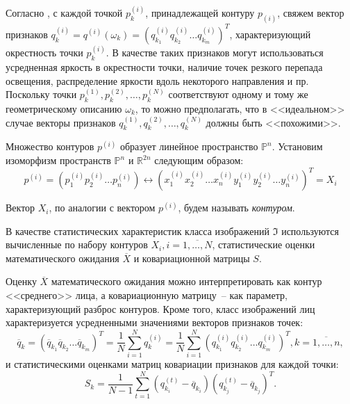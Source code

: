 Согласно \cite{harak_points}, с каждой точкой $p^{(i)}_k$, принадлежащей контуру $p_{(i)}$, свяжем
вектор признаков $q^{(i)}_k = q^{(i)}(\omega_k) = (q^{(i)}_{k_1}  q^{(i)}_{k_2}  \dots  q^{(i)}_{k_m})^T$,
характеризующий окрестность точки $p^{(i)}_k$. В качестве таких признаков могут 
использоваться усредненная яркость в окрестности точки, наличие точек резкого перепада освещения, распределение яркости 
вдоль некоторого направления и пр. Поскольку точки
$ p^{(1)}_k, p^{(2)}_k, \dots, p^{(N)}_k $ соответствуют одному и тому же геометрическому описанию $ \omega_k $,
то можно предполагать, что в <<идеальном>> случае векторы признаков 
$ q^{(1)}_k, q^{(2)}_k, \dots, q^{(N)}_k $ должны быть <<похожими>>.

Множество контуров $p^{(i)}$ образует линейное пространство $ \mathbb{P}^n$.
Установим изоморфизм пространств $ \mathbb{P}^n $ и $ \mathbb{R}^{2n}$ следующим образом:
\begin{equation}
    p^{(i)} = (p^{(i)}_1 p^{(i)}_2 \dots p^{(i)}_n) \longleftrightarrow
    (x^{(i)}_1  x^{(i)}_2  \dots x^{(i)}_n   y^{(i)}_1  y^{(i)}_2  \dots y^{(i)}_n)^T = \mathit{X_i}
\end{equation}

Вектор $\mathit{X_i}$, по аналогии с вектором $ p^{(i)} $, будем называть \textit{контуром}.

В качестве статистических характеристик класса изображений $\Im$ используются вычисленные по набору контуров
$\mathit{X_i}, i=\overline{1,\dots,N} $, статистические оценки математического ожидания $\overline{\mathit{X}}$
и ковариационной матрицы $S$.

Оценку $\overline{\mathit{X}}$ математического ожидания можно интерпретировать как контур <<среднего>>
лица, а ковариационную матрицу~-- как параметр, характеризующий разброс контуров. Кроме того,
класс изображений лиц характеризуется усредненными значениями векторов признаков точек:
\begin{equation}
    \label{math:imgs_classes}
    \overline{q}_k = (\overline{q}_{k_1} \overline{q}_{k_2} \dots \overline{q}_{k_m})^T =
    \frac{1}{N}\sum_{i=1}^N q_k^{(i)} = 
    \frac{1}{N}\sum_{i=1}^N (q^{(i)}_{k_1}  q^{(i)}_{k_2}  \dots  q^{(i)}_{k_m})^T, k = \overline{1,\dots,n},
\end{equation}
и статистическими оценками матриц ковариации признаков для 
каждой точки:
\begin{equation}
    \label{math:kova_marks}
    S_k = \frac{1}{N - 1}\sum_{t=1}^N(q_{k_i}^{(t)} - \overline{q}_{k_i})(q_{k_j}^{(t)} - \overline{q}_{k_j})^T.
\end{equation}

